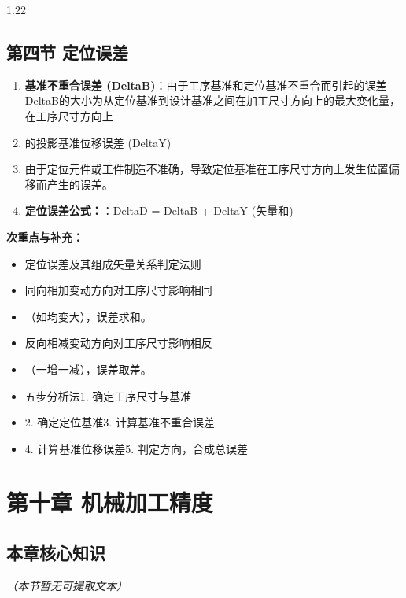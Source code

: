 \documentclass[12pt,a4paper]{article}
\begin{document}
\begin{spacing}{1.22}
\subsection{第四节 定位误差}
\begin{tcolorbox}[colback=yellow!6,colframe=red!55!black,title=重点,left=1mm,right=1mm]
\begin{enumerate}[leftmargin=2.2em,label=\arabic*.]
  \item \textbf{基准不重合误差 (DeltaB)}：由于工序基准和定位基准不重合而引起的误差DeltaB的大小为从定位基准到设计基准之间在加工尺寸方向上的最大变化量，在工序尺寸方向上
  \item 的投影基准位移误差 (DeltaY)
  \item 由于定位元件或工件制造不准确，导致定位基准在工序尺寸方向上发生位置偏移而产生的误差。
  \item \textbf{定位误差公式：}：DeltaD = DeltaB + DeltaY (矢量和)
\end{enumerate}
\end{tcolorbox}
\noindent\textbf{次重点与补充：}
\begin{itemize}[leftmargin=2.2em,label=--]
  \item 定位误差及其组成矢量关系判定法则
  \item 同向相加变动方向对工序尺寸影响相同
  \item （如均变大），误差求和。
  \item 反向相减变动方向对工序尺寸影响相反
  \item （一增一减），误差取差。
  \item 五步分析法1. 确定工序尺寸与基准
  \item 2. 确定定位基准3. 计算基准不重合误差
  \item 4. 计算基准位移误差5. 判定方向，合成总误差
\end{itemize}

\section{第十章 机械加工精度}
\subsection{本章核心知识}
\textit{（本节暂无可提取文本）}


\end{spacing}
\end{document}
